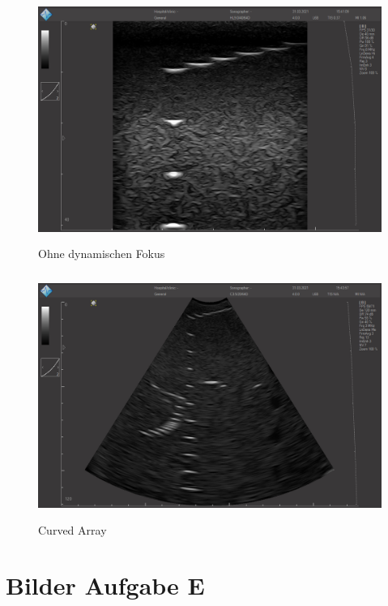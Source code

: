 \documentclass[11pt]{scrartcl}
\begin{document}
    \begin{figure}[H]
        \centering
        \includegraphics[height=8cm]{images/D_ohne_dynamisch_fokusiert_e}
        \caption{Ohne dynamischen Fokus}
        \label{fig:o_d_F}
    \end{figure}

    \begin{figure}[H]
        \centering
        \includegraphics[height=8cm]{images/D_3_e}
        \caption{Curved Array}
        \label{fig:curvedArray}
    \end{figure}

    \section{Bilder Aufgabe E}
\end{document}
